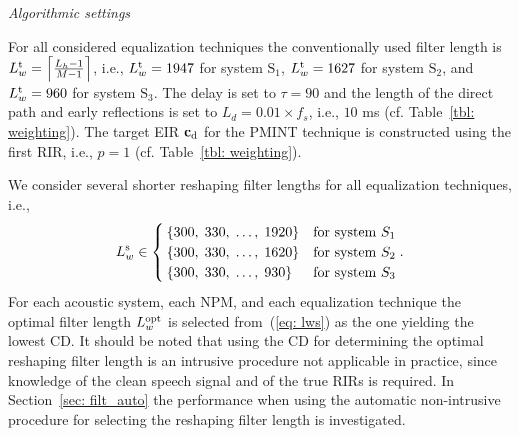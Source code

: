 \documentclass[twocolumn]{bmcart}%
\begin{document}
\vskip 5pt
\textit{Algorithmic settings} 
\vskip 5pt

For all considered equalization techniques the conventionally used filter length is $L^{\rm t}_w =\left\lceil{\frac{L_h-1}{M-1}}\right\rceil$, i.e., $L^{\rm t}_w = 1947$ for system $\text{S}_1$, $L^{\rm t}_w = 1627$ for system $\text{S}_2$, and $L^{\rm t}_w = 960$ for system $\text{S}_3$.
The delay is set to $\tau = 90$ and the length of the direct path and early reflections is set to $L_d = 0.01 \times f_s$, i.e., $10$ ms (cf. Table~\ref{tbl: weighting}).
The target EIR $\mathbf{c}_{\rm d}$ for the PMINT technique is constructed using the first RIR, i.e., $p = 1$ (cf. Table~\ref{tbl: weighting}).

We consider several shorter reshaping filter lengths for all equalization techniques, i.e., 
\begin{equation}
\label{eq: lws}
L^{\rm s}_w \in \begin{cases} \{300, \; 330, \; \ldots, \; 1920\} &\mbox{for system } S_1 \\
\{300, \; 330, \; \ldots, \; 1620\} & \mbox{for system } S_2 \\
\{300, \; 330, \; \ldots, \; 930\} & \mbox{for system } S_3 \end{cases}.
\end{equation}
For each acoustic system, each NPM, and each equalization technique the optimal filter length $L^{\rm opt}_w$ is selected from~(\ref{eq: lws}) as the one yielding the lowest CD. 
It should be noted that using the CD for determining the optimal reshaping filter length is an intrusive procedure not applicable in practice, since knowledge of the clean speech signal and of the true RIRs is required.
In Section~\ref{sec: filt_auto} the performance when using the automatic non-intrusive procedure for selecting the reshaping filter length is investigated.
\end{document}
